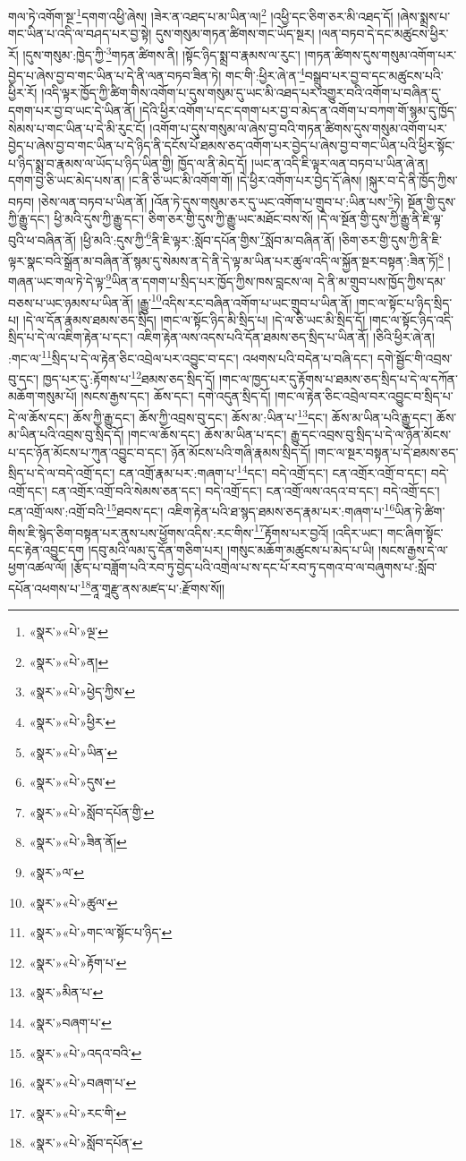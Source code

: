 གལ་ཏེ་འགོག་སྔ་\footnote{«སྣར་»«པེ་»ལྔ་}དགག་འཕྱི་ཞེས། །ཟེར་ན་འཐད་པ་མ་ཡིན་ལ།\footnote{«སྣར་»«པེ་»ན།} །འཕྱི་དང་ཅིག་ཅར་མི་འཐད་དོ། །ཞེས་སྨྲས་པ་གང་ཡིན་པ་འདི་ལ་བཤད་པར་བྱ་སྟེ། དུས་གསུམ་གཏན་ཚིགས་གང་ཡོད་སྔར། །ལན་བཏབ་དེ་དང་མཚུངས་ཕྱིར་རོ། །དུས་གསུམ་:ཁྱེད་ཀྱི་\footnote{«སྣར་»«པེ་»ཕྱེད་ཀྱིས་}གཏན་ཚིགས་ནི། །སྟོང་ཉིད་སྨྲ་བ་རྣམས་ལ་རུང་། །གཏན་ཚིགས་དུས་གསུམ་འགོག་པར་བྱེད་པ་ཞེས་བྱ་བ་གང་ཡིན་པ་དེ་ནི་ལན་བཏབ་ཟིན་ཏེ། གང་གི་:ཕྱིར་ཞེ་ན་\footnote{«སྣར་»«པེ་»ཕྱིར་}བསྒྲུབ་པར་བྱ་བ་དང་མཚུངས་པའི་ཕྱིར་རོ། །འདི་ལྟར་ཁྱོད་ཀྱི་ཚིག་གིས་འགོག་པ་དུས་གསུམ་དུ་ཡང་མི་འཐད་པར་འགྱུར་བའི་འགོག་པ་བཞིན་དུ་དགག་པར་བྱ་བ་ཡང་དེ་ཡིན་ནོ། །དེའི་ཕྱིར་འགོག་པ་དང་དགག་པར་བྱ་བ་མེད་ན་འགོག་པ་བཀག་གོ་སྙམ་དུ་ཁྱོད་སེམས་པ་གང་ཡིན་པ་དེ་མི་རུང་ངོ། །འགོག་པ་དུས་གསུམ་ལ་ཞེས་བྱ་བའི་གཏན་ཚིགས་དུས་གསུམ་འགོག་པར་བྱེད་པ་ཞེས་བྱ་བ་གང་ཡིན་པ་དེ་ཉིད་ནི་དངོས་པོ་ཐམས་ཅད་འགོག་པར་བྱེད་པ་ཞེས་བྱ་བ་གང་ཡིན་པའི་ཕྱིར་སྟོང་པ་ཉིད་སྨྲ་བ་རྣམས་ལ་ཡོད་པ་ཉིད་ཡིན་གྱི། ཁྱོད་ལ་ནི་མེད་དོ། །ཡང་ན་འདི་ཇི་ལྟར་ལན་བཏབ་པ་ཡིན་ཞེ་ན། དགག་བྱ་ཅི་ཡང་མེད་པས་ན། །ང་ནི་ཅི་ཡང་མི་འགོག་གོ། །དེ་ཕྱིར་འགོག་པར་བྱེད་དོ་ཞེས། །སྐུར་བ་དེ་ནི་ཁྱོད་ཀྱིས་བཏབ། །ཅེས་ལན་བཏབ་པ་ཡིན་ནོ། །འོན་ཏེ་དུས་གསུམ་ཅར་དུ་ཡང་འགོག་པ་གྲུབ་པ་:ཡིན་པས་\footnote{«སྣར་»«པེ་»ཡིན་}ཏེ། སྔོན་གྱི་དུས་ཀྱི་རྒྱུ་དང་། ཕྱི་མའི་དུས་ཀྱི་རྒྱུ་དང་། ཅིག་ཅར་གྱི་དུས་ཀྱི་རྒྱུ་ཡང་མཐོང་བས་སོ། །དེ་ལ་སྔོན་གྱི་དུས་ཀྱི་རྒྱུ་ནི་ཇི་ལྟ་བུའི་ཕ་བཞིན་ནོ། །ཕྱི་མའི་:དུས་ཀྱི་\footnote{«སྣར་»«པེ་»དུས་}ནི་ཇི་ལྟར་:སློབ་དཔོན་གྱིས་\footnote{«སྣར་»«པེ་»སློབ་དཔོན་གྱི་}སློབ་མ་བཞིན་ནོ། །ཅིག་ཅར་གྱི་དུས་ཀྱི་ནི་ཇི་ལྟར་སྣང་བའི་སྒྲོན་མ་བཞིན་ནོ་སྙམ་དུ་སེམས་ན་དེ་ནི་དེ་ལྟ་མ་ཡིན་པར་ཚུལ་འདི་ལ་སྐྱོན་སྔར་བསྟན་:ཟིན་ཏོ།\footnote{«སྣར་»«པེ་»ཟིན་ནོ།} །གཞན་ཡང་གལ་ཏེ་དེ་ལྟ་\footnote{«སྣར་»ལ་}ཡིན་ན་དགག་པ་སྲིད་པར་ཁྱོད་ཀྱིས་ཁས་བླངས་ལ། དེ་ནི་མ་གྲུབ་པས་ཁྱོད་ཀྱིས་དམ་བཅས་པ་ཡང་ཉམས་པ་ཡིན་ནོ། །རྒྱུ་\footnote{«སྣར་»«པེ་»ཚུལ་}འདིས་རང་བཞིན་འགོག་པ་ཡང་གྲུབ་པ་ཡིན་ནོ། །གང་ལ་སྟོང་པ་ཉིད་སྲིད་པ། །དེ་ལ་དོན་རྣམས་ཐམས་ཅད་སྲིད། །གང་ལ་སྟོང་ཉིད་མི་སྲིད་པ། །དེ་ལ་ཅི་ཡང་མི་སྲིད་དོ། །གང་ལ་སྟོང་ཉིད་འདི་སྲིད་པ་དེ་ལ་འཇིག་རྟེན་པ་དང་། འཇིག་རྟེན་ལས་འདས་པའི་དོན་ཐམས་ཅད་སྲིད་པ་ཡིན་ནོ། །ཅིའི་ཕྱིར་ཞེ་ན། :གང་ལ་\footnote{«སྣར་»«པེ་»གང་ལ་སྟོང་པ་ཉིད་}སྲིད་པ་དེ་ལ་རྟེན་ཅིང་འབྲེལ་པར་འབྱུང་བ་དང་། འཕགས་པའི་བདེན་པ་བཞི་དང་། དགེ་སྦྱོང་གི་འབྲས་བུ་དང་། ཁྱད་པར་དུ་:རྟོགས་པ་\footnote{«སྣར་»«པེ་»རྟོག་པ་}ཐམས་ཅད་སྲིད་དོ། །གང་ལ་ཁྱད་པར་དུ་རྟོགས་པ་ཐམས་ཅད་སྲིད་པ་དེ་ལ་དཀོན་མཆོག་གསུམ་པོ། །སངས་རྒྱས་དང་། ཆོས་དང་། དགེ་འདུན་སྲིད་དོ། །གང་ལ་རྟེན་ཅིང་འབྲེལ་བར་འབྱུང་བ་སྲིད་པ་དེ་ལ་ཆོས་དང་། ཆོས་ཀྱི་རྒྱུ་དང་། ཆོས་ཀྱི་འབྲས་བུ་དང་། ཆོས་མ་:ཡིན་པ་\footnote{«སྣར་»མིན་པ་}དང་། ཆོས་མ་ཡིན་པའི་རྒྱུ་དང་། ཆོས་མ་ཡིན་པའི་འབྲས་བུ་སྲིད་དོ། །གང་ལ་ཆོས་དང་། ཆོས་མ་ཡིན་པ་དང་། རྒྱུ་དང་འབྲས་བུ་སྲིད་པ་དེ་ལ་ཉོན་མོངས་པ་དང་ཉོན་མོངས་པ་ཀུན་འབྱུང་བ་དང་། ཉོན་མོངས་པའི་གཞི་རྣམས་སྲིད་དོ། །གང་ལ་སྔར་བསྟན་པ་དེ་ཐམས་ཅད་སྲིད་པ་དེ་ལ་བདེ་འགྲོ་དང་། ངན་འགྲོ་རྣམ་པར་:གཞག་པ་\footnote{«སྣར་»བཞག་པ་}དང་། བདེ་འགྲོ་དང་། ངན་འགྲོར་འགྲོ་བ་དང་། བདེ་འགྲོ་དང་། ངན་འགྲོར་འགྲོ་བའི་སེམས་ཅན་དང་། བདེ་འགྲོ་དང་། ངན་འགྲོ་ལས་འདའ་བ་དང་། བདེ་འགྲོ་དང་། ངན་འགྲོ་ལས་:འགྲོ་བའི་\footnote{«སྣར་»«པེ་»འདའ་བའི་}ཐབས་དང་། འཇིག་རྟེན་པའི་ཐ་སྙད་ཐམས་ཅད་རྣམ་པར་:གཞག་པ་\footnote{«སྣར་»«པེ་»བཞག་པ་}ཡིན་ཏེ་ཚིག་གིས་ཇི་སྙེད་ཅིག་བསྟན་པར་ནུས་པས་ཕྱོགས་འདིས་:རང་གིས་\footnote{«སྣར་»«པེ་»རང་གི་}རྟོགས་པར་བྱའོ། །འདིར་ཡང་། གང་ཞིག་སྟོང་དང་རྟེན་འབྱུང་དག །དབུ་མའི་ལམ་དུ་དོན་གཅིག་པར། །གསུང་མཆོག་མཚུངས་པ་མེད་པ་ཡི། །སངས་རྒྱས་དེ་ལ་ཕྱག་འཚལ་ལོ། །རྩོད་པ་བཟློག་པའི་རབ་ཏུ་བྱེད་པའི་འགྲེལ་པ་ས་དང་པོ་རབ་ཏུ་དགའ་བ་ལ་བཞུགས་པ་:སློབ་དཔོན་འཕགས་པ་\footnote{«སྣར་»«པེ་»སློབ་དཔོན་}ནཱ་གཱརྫུ་ནས་མཛད་པ་:རྫོགས་སོ།། 